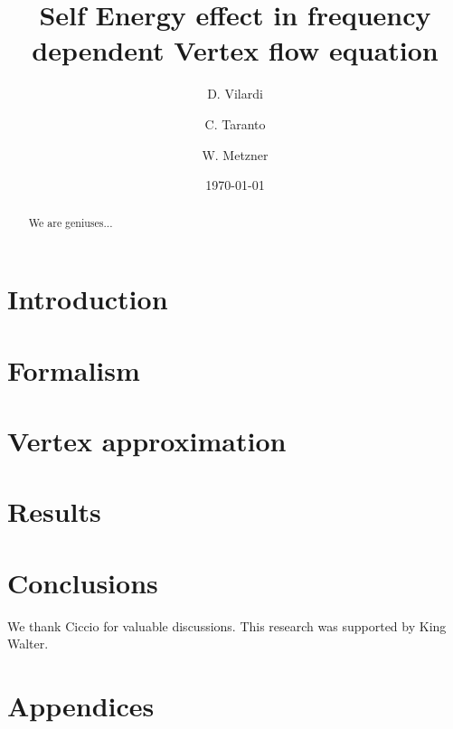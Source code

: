 \documentclass[aps,prb,twocolumn,showpacs,superscriptaddress,groupedaddress]{revtex4}
\begin{document}
\title{Self Energy effect in frequency dependent Vertex flow equation}

\author {D. Vilardi}
\author{C. Taranto}
\author{W. Metzner}

\date{\today}

\begin{abstract}
We are geniuses...
\end{abstract}

\pacs{}
\maketitle

\section{Introduction}
\label{sec:introduction}


\section{Formalism}
\label{sec:formalism}



\section{Vertex approximation}
\label{sec:vertex}


\section{Results}
\label{sec:results}


\section{Conclusions}
\label{sec:conclusions}


\begin{acknowledgments}
We thank Ciccio for valuable discussions. This research was supported by King Walter.
\end{acknowledgments}

\section{Appendices}
\label{sec:appendices}


%  
\end{document}
